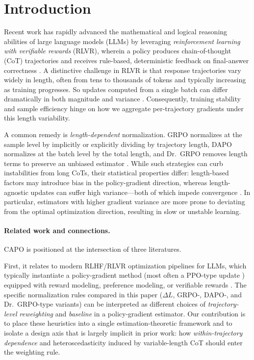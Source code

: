 \section{Introduction}\label{secInt}

Recent work has rapidly advanced the mathematical and logical reasoning abilities of large language models (LLMs) by leveraging \emph{reinforcement learning with verifiable rewards} (RLVR), wherein a policy produces chain-of-thought (CoT) trajectories and receives rule-based, deterministic feedback on final-answer correctness \citep{shao2024deepseekmath,qwen2024qwen25,yu2025dapo,he2025deltal}. A distinctive challenge in RLVR is that response trajectories vary widely in length, often from tens to thousands of tokens and typically increasing as training progresses. So updates computed from a single batch can differ dramatically in both magnitude and variance \citep{yu2025dapo,he2025deltal}. Consequently, training stability and sample efficiency hinge on how we aggregate per-trajectory gradients under this length variability.

A common remedy is \emph{length-dependent} normalization. GRPO normalizes at the sample level by implicitly or explicitly dividing by trajectory length, DAPO normalizes at the batch level by the total length, and Dr.\ GRPO removes length terms to preserve an unbiased estimator \citep{shao2024deepseekmath,yu2025dapo,liu2025drgrpo}. While such strategies can curb instabilities from long CoTs, their statistical properties differ: length-based factors may introduce bias in the policy-gradient direction, whereas length-agnostic updates can suffer high variance—both of which impede convergence \citep{williams1992simple,sutton2018rl,schulman2016gae,he2025deltal}. In particular, estimators with higher gradient variance are more prone to deviating from the optimal optimization direction, resulting in slow or unstable learning.

\paragraph{Related work and connections.}
CAPO is positioned at the intersection of three literatures.

First, it relates to modern RLHF/RLVR optimization pipelines for LLMs, which typically instantiate a policy-gradient method (most often a PPO-type update \citep{schulman2017ppo}) equipped with reward modeling, preference modeling, or verifiable rewards \citep{ouyang2022instructgpt,shao2024deepseekmath,rafailov2023dpo}.
The specific normalization rules compared in this paper ($\Delta L$, GRPO-, DAPO-, and Dr.~GRPO-type variants) can be interpreted as different choices of \emph{trajectory-level reweighting} and \emph{baseline} in a policy-gradient estimator.
Our contribution is to place these heuristics into a single estimation-theoretic framework and to isolate a design axis that is largely implicit in prior work: how \emph{within-trajectory dependence} and heteroscedasticity induced by variable-length CoT should enter the weighting rule.


